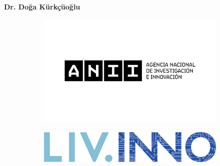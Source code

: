 \begin{titlepage}
\begin{center}
	\vspace{2mm}
 	
	\large{\textbf{Dr. Doğa Kürkçüoğlu}}
\end{center}



\vspace{2mm}
\begin{figure}[!htb]
    \centering    
    \begin{subfigure}[c]{0.45\textwidth}
    	\centering
		\includegraphics[keepaspectratio=true,scale=0.045]{LOGOTIPO ANII + DENOMINACION 01_CMYK.jpg}   
    \end{subfigure}
    \begin{subfigure}[c]{0.45\textwidth}
    	\centering
		\includegraphics[keepaspectratio=true,scale=0.24]{livinno.png}   
    \end{subfigure}
\end{figure}





\end{titlepage}
